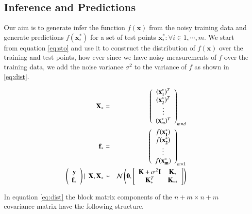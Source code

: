 \documentclass[referee,a4paper,12pt,traditabstract]{swsc}
\begin{document}
\begin{linenumbers}
\subsection{Inference and Predictions}

Our aim is to generate infer the function $f(\mathbf{x})$ from the noisy training data and generate predictions $f(\mathbf{x}^{*}_i)$ for a set of test points $ {\mathbf{x}^{*}_i : \forall i \in 1, \cdots, m} $. We start from equation \ref{eq:sto} and use it to construct the distribution of $f(\mathbf{x})$ over the training and test points, how ever since we have noisy measurements of $f$ over the training data, we add the noise variance $\sigma^2$ to the variance of $f$ as shown in \ref{eq:dist}.

\begin{eqnarray}
    \mathbf{X}_* & = & \left( \begin{array}{c} (\mathbf{x}^{*}_1)^T \\ (\mathbf{x}^{*}_2)^T \\ \vdots \\ (\mathbf{x}^{*}_m)^T \end{array} \right)_{m \times d} \\
    \mathbf{f}_* & = & \left( \begin{array}{c} f(\mathbf{x^{*}_1}) \\ f(\mathbf{x^{*}_2}) \\ \vdots \\ f(\mathbf{x^{*}_m}) \end{array} \right)_{m \times 1} \\
     \vspace{4\baselineskip}
    \left( \begin{array}{c} \mathbf{y} \\ \mathbf{f_*} \end{array} \right) | \ \ \mathbf{X}, \mathbf{X}_* & \sim & 
    \mathcal{N}\left(\mathbf{0}, \left[ \begin{array}{cc} \mathbf{K} + \sigma^{2} \mathbf{I} & \mathbf{K}_{*} \\ \mathbf{K}_{*}^T & \mathbf{K}_{**} \end{array} \right ] \right) \label{eq:dist}
\end{eqnarray}

In equation \ref{eq:dist} the block matrix components of the $n+m \times n+m$ covariance matrix have the following structure.


\end{linenumbers}
\end{document}
